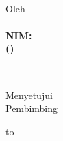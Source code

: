 \begin{center}
	\textbf{\large{\MakeUppercase{\judul}}}\\

	\addvspace{3cm}

	Oleh\\
	\textbf{
		\myname\\
		NIM: \mysid\\
		(\mydept)\\
	}

	\bigskip
	\itb\\

	\addvspace{3cm}

	Menyetujui\\
	Pembimbing\\
	\bigskip

	\vfill

	\makebox[6cm][c]{
		\hrulefill
	}
	\hbox to \hsize{%
		\strut\hfil%
		(\myadvisorname)%
		\hfil%
	}
\end{center}
